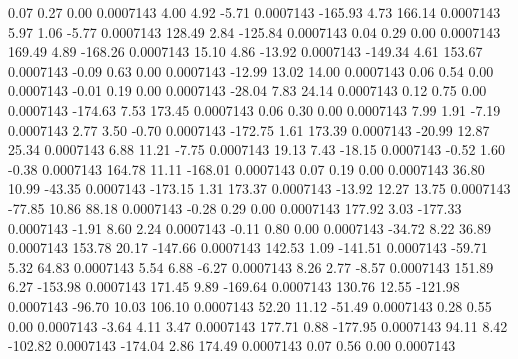         0.07        0.27        0.00     0.0007143
        4.00        4.92       -5.71     0.0007143
     -165.93        4.73      166.14     0.0007143
        5.97        1.06       -5.77     0.0007143
      128.49        2.84     -125.84     0.0007143
        0.04        0.29        0.00     0.0007143
      169.49        4.89     -168.26     0.0007143
       15.10        4.86      -13.92     0.0007143
     -149.34        4.61      153.67     0.0007143
       -0.09        0.63        0.00     0.0007143
      -12.99       13.02       14.00     0.0007143
        0.06        0.54        0.00     0.0007143
       -0.01        0.19        0.00     0.0007143
      -28.04        7.83       24.14     0.0007143
        0.12        0.75        0.00     0.0007143
     -174.63        7.53      173.45     0.0007143
        0.06        0.30        0.00     0.0007143
        7.99        1.91       -7.19     0.0007143
        2.77        3.50       -0.70     0.0007143
     -172.75        1.61      173.39     0.0007143
      -20.99       12.87       25.34     0.0007143
        6.88       11.21       -7.75     0.0007143
       19.13        7.43      -18.15     0.0007143
       -0.52        1.60       -0.38     0.0007143
      164.78       11.11     -168.01     0.0007143
        0.07        0.19        0.00     0.0007143
       36.80       10.99      -43.35     0.0007143
     -173.15        1.31      173.37     0.0007143
      -13.92       12.27       13.75     0.0007143
      -77.85       10.86       88.18     0.0007143
       -0.28        0.29        0.00     0.0007143
      177.92        3.03     -177.33     0.0007143
       -1.91        8.60        2.24     0.0007143
       -0.11        0.80        0.00     0.0007143
      -34.72        8.22       36.89     0.0007143
      153.78       20.17     -147.66     0.0007143
      142.53        1.09     -141.51     0.0007143
      -59.71        5.32       64.83     0.0007143
        5.54        6.88       -6.27     0.0007143
        8.26        2.77       -8.57     0.0007143
      151.89        6.27     -153.98     0.0007143
      171.45        9.89     -169.64     0.0007143
      130.76       12.55     -121.98     0.0007143
      -96.70       10.03      106.10     0.0007143
       52.20       11.12      -51.49     0.0007143
        0.28        0.55        0.00     0.0007143
       -3.64        4.11        3.47     0.0007143
      177.71        0.88     -177.95     0.0007143
       94.11        8.42     -102.82     0.0007143
     -174.04        2.86      174.49     0.0007143
        0.07        0.56        0.00     0.0007143
